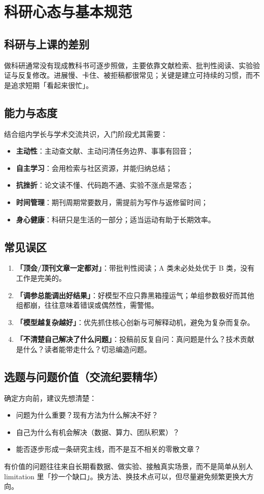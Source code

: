 \section{科研心态与基本规范}

\subsection{科研与上课的差别}
做科研通常没有现成教科书可逐步照做，主要依靠文献检索、批判性阅读、实验验证与反复修改。进展慢、卡住、被拒稿都很常见；关键是建立可持续的习惯，而不是追求短期「看起来很忙」。

\subsection{能力与态度}
结合组内学长与学术交流共识，入门阶段尤其需要：
\begin{itemize}
  \item \textbf{主动性}：主动查文献、主动问清任务边界、事事有回音；
  \item \textbf{自主学习}：会用检索与社区资源，并能归纳总结；
  \item \textbf{抗挫折}：论文读不懂、代码跑不通、实验不涨点是常态；
  \item \textbf{时间管理}：期刊周期常要数月，需提前为写作与返修留时间；
  \item \textbf{身心健康}：科研只是生活的一部分；适当运动有助于长期效率。
\end{itemize}

\subsection{常见误区}
\begin{enumerate}
  \item \textbf{「顶会/顶刊文章一定都对」}：带批判性阅读；A 类未必处处优于 B 类，没有工作是完美的。
  \item \textbf{「调参总能调出好结果」}：好模型不应只靠黑箱撞运气；单组参数极好而其他组都崩，往往意味着错误或偶然性，需警惕。
  \item \textbf{「模型越复杂越好」}：优先抓住核心创新与可解释动机，避免为复杂而复杂。
  \item \textbf{「不清楚自己解决了什么问题」}：投稿前反复自问：真问题是什么？技术贡献是什么？读者能带走什么？切忌编造问题。
\end{enumerate}

\subsection{选题与问题价值（交流纪要精华）}
确定方向前，建议先想清楚：
\begin{itemize}
  \item 问题为什么重要？现有方法为什么解决不好？
  \item 自己为什么有机会解决（数据、算力、团队积累）？
  \item 能否逐步形成一条研究主线，而不是互不相关的零散文章？
\end{itemize}
有价值的问题往往来自长期看数据、做实验、接触真实场景，而不是简单从别人 limitation 里「抄一个缺口」。换方法、换技术点可以，但尽量避免频繁更换大方向。

